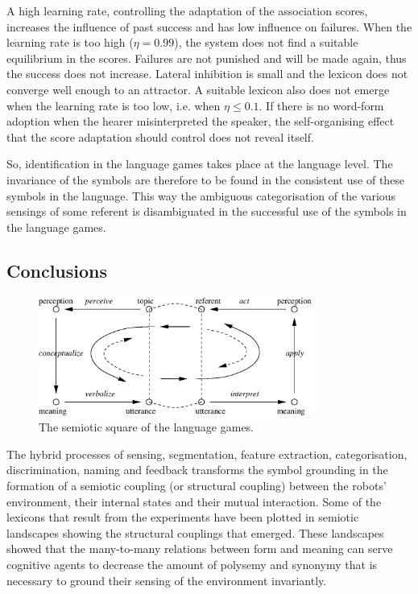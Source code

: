 A high learning rate, controlling the adaptation of the association scores, increases the influence of past success and has low influence on failures. When the learning rate is too high ($\eta=0.99$), the system does not find a suitable equilibrium in the scores. Failures are not punished and will be made again, thus the success does not increase. Lateral inhibition is small and the lexicon does not converge well enough to an attractor. A suitable lexicon also does not emerge when the learning rate is too low, i.e. when $\eta \leq 0.1$. If there is no word-form adoption when the hearer misinterpreted the speaker, the self-organising effect that the score adaptation should control does not reveal itself.


So, identification in the language games takes place at the language level. The invariance of the symbols are therefore to be found in the consistent use of these symbols in the language. This way the ambiguous categorisation of the various sensings of some referent is disambiguated in the successful use of the symbols in the language games.

\subsection{Conclusions}

\begin{figure}
\centerline{\includegraphics[width=9cm]{discr_games/semiotic1.eps}}
\caption{The semiotic square of the language games.}
\label{f:disc:semiotic}
\end{figure}

The hybrid processes of sensing, segmentation, feature extraction, categorisation, discrimination, naming and feedback transforms the symbol grounding in the formation of a semiotic coupling (or structural coupling)  between the robots' environment, their internal states and their mutual interaction. Some of the lexicons that result from the experiments have been plotted in semiotic landscapes showing the structural couplings that emerged. These landscapes showed that the many-to-many relations between form and meaning can serve cognitive agents to decrease the amount of polysemy and synonymy that is necessary to ground their sensing of the environment invariantly.

